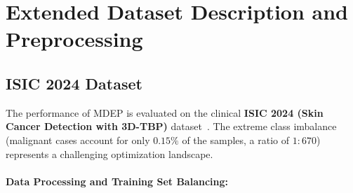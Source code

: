 \documentclass[letterpaper]{article} %
\begin{document}
\section{Extended Dataset Description and Preprocessing}
\subsection{ISIC 2024 Dataset}\label{subsec:isic}

The performance of MDEP is evaluated on the clinical \textbf{ISIC 2024 (Skin Cancer Detection with 3D-TBP)} dataset~\cite{isic2024, codella2019skin, tschandl2018ham10000}. The extreme class imbalance (malignant cases account for only $0.15\%$ of the samples, a ratio of $1{:}670$) represents a challenging optimization landscape.

\paragraph{Data Processing and Training Set Balancing:}
\end{document}
